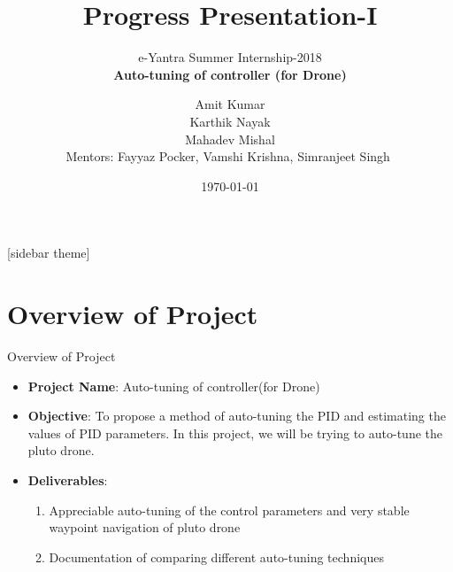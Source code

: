 \documentclass[10pt, a4paper]{beamer}
\begin{document}
	\title{Progress Presentation-I}
	\subtitle{e-Yantra Summer Internship-2018 \\ $ $\textbf{Auto-tuning of controller (for Drone)}$ $}
	\author{$ $Amit Kumar$ $\\$ $Karthik Nayak$ $\\$ $Mahadev Mishal$ $\\
	Mentors: $ $Fayyaz Pocker, Vamshi Krishna, Simranjeet Singh  $ $}
	\date{\today}
	\frame{\titlepage}

[sidebar theme]
\section{Overview of Project}
\begin{frame}{Overview of Project}
	\begin{itemize}
		\item \textbf{Project Name}:  Auto-tuning of controller(for Drone)\\\vspace{1em}
		\item \textbf{Objective}: To propose a method of auto-tuning the PID and estimating the values of PID parameters. In this project, we will be trying to auto-tune the pluto drone.\\\vspace{1em}
		\item \textbf{Deliverables}: \begin{enumerate}
				\item Appreciable auto-tuning of the control parameters and very stable waypoint navigation of pluto drone 
				\item Documentation of comparing different auto-tuning techniques
				\end{enumerate}
	\end{itemize}
\end{frame}
\end{document}

